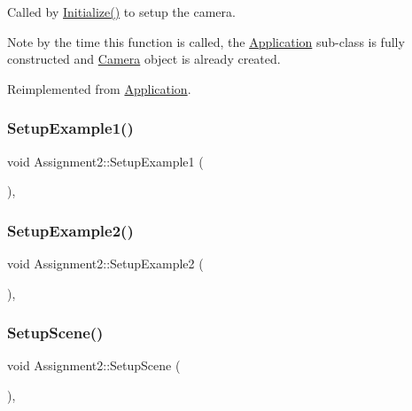 Called by \hyperlink{class_application_a17cf1ea4552d26a1c20f7d98d793d41d}{Initialize()} to setup the camera.

Note by the time this function is called, the \hyperlink{class_application}{Application} sub-\/class is fully constructed and \hyperlink{class_camera}{Camera} object is already created.

Reimplemented from \hyperlink{class_application_a2eb61ca027f223a5c5ad1bf982481193}{Application}.

\hypertarget{class_assignment2_a2f42c6da59d8b5ba5dc4796d8bd13d30}{}\label{class_assignment2_a2f42c6da59d8b5ba5dc4796d8bd13d30}
\subsubsection{\texorpdfstring{Setup\+Example1()}{SetupExample1()}}
{\footnotesize\ttfamily void Assignment2\+::\+Setup\+Example1 (\begin{DoxyParamCaption}{ }\end{DoxyParamCaption})\hspace{0.3cm}{\ttfamily [private]}, {\ttfamily [virtual]}}

\hypertarget{class_assignment2_aa26c3cd3e97be7ef88aae8d26d4af6bc}{}\label{class_assignment2_aa26c3cd3e97be7ef88aae8d26d4af6bc}
\subsubsection{\texorpdfstring{Setup\+Example2()}{SetupExample2()}}
{\footnotesize\ttfamily void Assignment2\+::\+Setup\+Example2 (\begin{DoxyParamCaption}{ }\end{DoxyParamCaption})\hspace{0.3cm}{\ttfamily [private]}, {\ttfamily [virtual]}}

\hypertarget{class_assignment2_aa4f8ccd09a7accbdf093394c6ee4f63f}{}\label{class_assignment2_aa4f8ccd09a7accbdf093394c6ee4f63f}
\subsubsection{\texorpdfstring{Setup\+Scene()}{SetupScene()}}
{\footnotesize\ttfamily void Assignment2\+::\+Setup\+Scene (\begin{DoxyParamCaption}{ }\end{DoxyParamCaption})\hspace{0.3cm}{\ttfamily [private]}, {\ttfamily [virtual]}}



